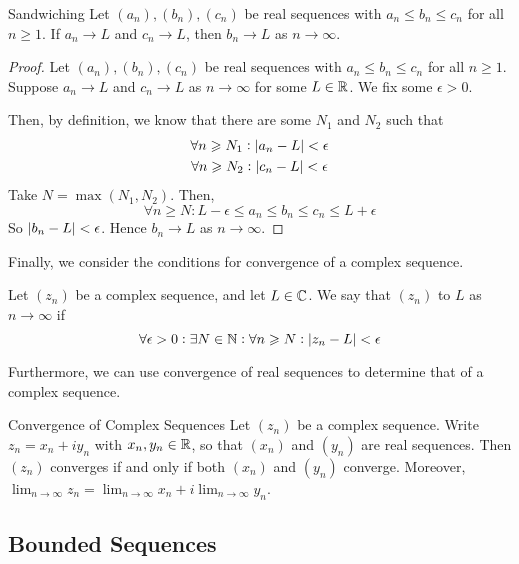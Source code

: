 \documentclass{styles/tufte}
\begin{document}
    \begin{proposition}{Sandwiching}{}
      Let $(a_n), (b_n), (c_n)$ be real sequences with $a_n \leqslant b_n \leqslant c_n$ for all $n \geqslant 1$. If $a_n \to L$ and $c_n \to L$, then $b_n \to L$ as $n \to \infty$.
    \end{proposition}
    \begin{proof}
      Let $(a_n), (b_n), (c_n)$ be real sequences with $a_n \leqslant b_n \leqslant c_n$ for all $n \geqslant 1$. Suppose $a_n \to L$ and $c_n \to L$ as $n \to \infty$ for some $L \in \mathbb{R}$. We fix some $\epsilon > 0$.
      
      Then, by definition, we know that there are some $N_1$ and $N_2$ such that
      \begin{gather*}
        \forall n \geqslant N_1 : \abs{a_n - L} < \epsilon \\
        \forall n \geqslant N_2 : \abs{c_n - L} < \epsilon
      \end{gather*}
      Take $N = \max(N_1, N_2)$. Then,
      \[ \forall n \geqslant N : L - \epsilon \leqslant a_n \leqslant b_n \leqslant c_n \leqslant L + \epsilon \]
      So $\abs{b_n - L} < \epsilon$. Hence $b_n \to L$ as $n \to \infty$.
    \end{proof}
    
    Finally, we consider the conditions for convergence of a complex sequence.
    
    \begin{definition}{}{}
      Let $(z_n)$ be a complex sequence, and let $L \in \mathbb{C}$. We say that $(z_n)$  to $L$ as $n \to \infty$ if
      \[ \forall \epsilon > 0 : \exists N \in \NN : \forall n \geqslant N : \abs{z_n - L} < \epsilon \]
    \end{definition}
    
    Furthermore, we can use convergence of real sequences to determine that of a complex sequence.
    
    \begin{theorem}{Convergence of Complex Sequences}{}
      Let $(z_n)$ be a complex sequence. Write $z_n = x_n + iy_n$ with $x_n, y_n \in \mathbb{R}$, so that $(x_n)$ and $(y_n)$ are real sequences. Then $(z_n)$ converges if and only if both $(x_n)$ and $(y_n)$ converge. Moreover, $\displaystyle \lim_{n \to \infty} z_n = \lim_{n \to \infty} x_n + i \lim_{n \to \infty} y_n$.
    \end{theorem}
  
  
  \subsection{Bounded Sequences}
    
\end{document}

